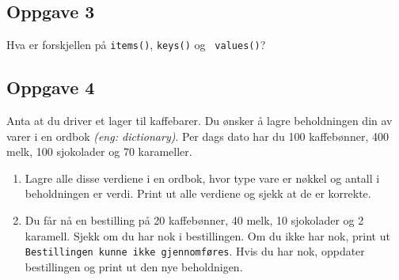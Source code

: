 \documentclass{article}
\begin{document}
\subsection*{Oppgave 3}

Hva er forskjellen på \texttt{items()},  \texttt{keys()} og  \texttt{ values()}?

\subsection*{Oppgave 4}
Anta at du driver et lager til kaffebarer. Du ønsker å lagre beholdningen din av varer i en ordbok \textit{(eng: dictionary)}. Per dags dato har du 100 kaffebønner, 400 melk, 100 sjokolader og 70 karameller. 

\begin{enumerate}
\item Lagre alle disse verdiene i en ordbok, hvor type vare er nøkkel og antall i beholdningen er verdi. Print ut alle verdiene og sjekk at de er korrekte.
\item  Du får nå en bestilling på 20 kaffebønner, 40 melk, 10 sjokolader og 2 karamell. Sjekk om du har nok i bestillingen. Om du ikke har nok, print ut \texttt{Bestillingen kunne ikke gjennomføres}. Hvis du har nok, oppdater bestillingen og print ut den nye beholdnigen. 
\end{enumerate}
\end{document}
